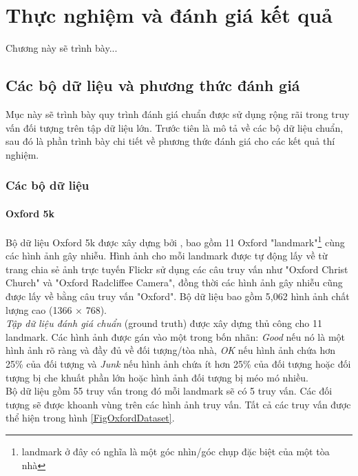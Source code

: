 \chapter{Thực nghiệm và đánh giá kết quả}
\ifpdf
    \graphicspath{{Chapter4/Chapter4Figs/PNG/}{Chapter4/Chapter4Figs/PDF/}{Chapter4/Chapter4Figs/}}
\else
    \graphicspath{{Chapter4/Chapter4Figs/EPS/}{Chapter4/Chapter4Figs/}}
\fi
{}

Chương này sẽ trình bày...

\section{Các bộ dữ liệu và phương thức đánh giá}
Mục này sẽ trình bày quy trình đánh giá chuẩn được sử dụng rộng rãi trong truy vấn đối tượng trên tập dữ liệu lớn. Trước tiên là mô tả về các bộ dữ liệu chuẩn, sau đó là phần trình bày chi tiết về phương thức đánh giá cho các kết quả thí nghiệm.

\subsection{Các bộ dữ liệu}

\subsubsection{Oxford 5k}
Bộ dữ liệu Oxford 5k được xây dựng bởi \cite{philbin2007object}, bao gồm 11 Oxford "landmark"\footnote{landmark ở đây có nghĩa là một góc nhìn/góc chụp đặc biệt của một tòa nhà} cùng các hình ảnh gây nhiễu. Hình ảnh cho mỗi landmark được tự động lấy về từ trang chia sẻ ảnh trực tuyến Flickr sử dụng các câu truy vấn như "Oxford Christ Church" và "Oxford Radcliffee Camera", đồng thời các hình ảnh gây nhiễu cũng được lấy về bằng câu truy vấn "Oxford". Bộ dữ liệu bao gồm 5,062 hình ảnh chất lượng cao (1366 $\times$ 768).\\
\textit{Tập dữ liệu đánh giá chuẩn} (ground truth) được xây dựng thủ công cho 11 landmark. Các hình ảnh được gán vào một trong bốn nhãn: \textit{Good} nếu nó là một hình ảnh rõ ràng và đầy đủ về đối tượng/tòa nhà, \textit{OK} nếu hình ảnh chứa hơn 25\% của đối tượng và \textit{Junk} nếu hình ảnh chứa ít hơn 25\% của đối tượng hoặc đối tượng bị che khuất phần lớn hoặc hình ảnh đối tượng bị méo mó nhiều.\\
Bộ dữ liệu gồm 55 truy vấn trong đó mỗi landmark sẽ có 5 truy vấn. Các đối tượng sẽ được khoanh vùng trên các hình ảnh truy vấn. Tất cả các truy vấn được thể hiện trong hình \ref{FigOxfordDataset}.

